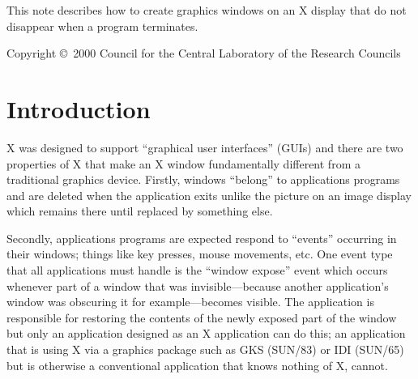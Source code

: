 \documentclass[twoside,11pt]{article}
\newcommand{\stardocinitials}  {SUN}
\newcommand{\stardoccopyright} 
{Copyright \copyright\ 2000 Council for the Central Laboratory of the Research Councils}
\newcommand{\stardocnumber}    {130.5}
\newcommand{\stardocabstract}  {This note describes how to create graphics
windows on an X display that do not disappear when a program terminates.}
\newcommand{\stardocname}{\stardocinitials /\stardocnumber}
\newenvironment{latexonly}{}{}
\newcommand{\xref}[3]{#1}
\renewcommand{\_}{\texttt{\symbol{95}}}
\renewcommand{\thepage}{\roman{page}}
\begin{document}
\stardocabstract

\begin{latexonly}
\newpage
\vspace*{\fill}
\stardoccopyright
\end{latexonly}

  \newpage
  \begin{latexonly}
    \setlength{\parskip}{0mm}
    \tableofcontents
    \setlength{\parskip}{\medskipamount}
    \markboth{\stardocname}{\stardocname}
  \end{latexonly}

\cleardoublepage
\renewcommand{\thepage}{\arabic{page}}
\setcounter{page}{1}

\section{Introduction}

X was designed to support ``graphical user interfaces'' (GUIs) and there are two
properties of X that make an X window fundamentally different from a
traditional graphics device.
Firstly, windows ``belong'' to applications programs and are deleted when the
application exits unlike the picture on an image display which remains there
until replaced by something else. 

Secondly, applications
programs are expected respond to ``events'' occurring in their windows;
things like key presses, mouse movements, etc. One event type that all
applications must handle is the ``window expose'' event which occurs whenever
part of a window that was invisible---because another application's window was
obscuring it for example---becomes visible. The application is responsible for
restoring the contents of the newly exposed part of the window but only an
application designed as an X application can do this; an application that is
using X via a graphics package such as GKS (\xref{SUN/83}{sun83}{})
or IDI (\xref{SUN/65}{sun65}{}) but is otherwise a
conventional application that knows nothing of X, cannot.
\end{document}
